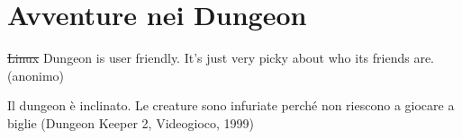 \section{Avventure nei Dungeon}

\begin{changemargin}{0.3cm}{0.3cm}\begin{enfasi}{

\st{Linux} Dungeon is user friendly. It's just very picky about who its friends are. (anonimo)

\medskip

Il dungeon è inclinato. Le creature sono infuriate perché non riescono a giocare a biglie (Dungeon Keeper 2, Videogioco, 1999)

}\end{enfasi}\end{changemargin}\medskip

